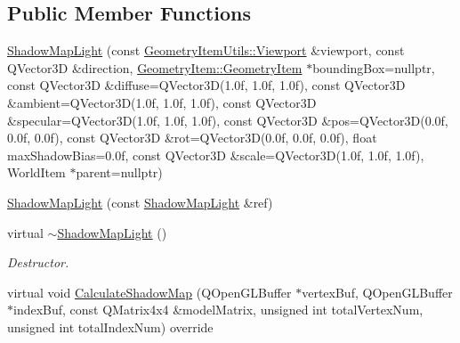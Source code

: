 \subsection*{Public Member Functions}
\begin{DoxyCompactItemize}
\item 
\mbox{\hyperlink{class_geometry_engine_1_1_geometry_world_item_1_1_geometry_light_1_1_shadow_map_light_a3289b4d430e9c738be137a38084d1906}{Shadow\+Map\+Light}} (const \mbox{\hyperlink{class_geometry_engine_1_1_geometry_item_utils_1_1_viewport}{Geometry\+Item\+Utils\+::\+Viewport}} \&viewport, const Q\+Vector3D \&direction, \mbox{\hyperlink{class_geometry_engine_1_1_geometry_world_item_1_1_geometry_item_1_1_geometry_item}{Geometry\+Item\+::\+Geometry\+Item}} $\ast$bounding\+Box=nullptr, const Q\+Vector3D \&diffuse=Q\+Vector3D(1.\+0f, 1.\+0f, 1.\+0f), const Q\+Vector3\+D \&ambient=\+Q\+Vector3\+D(1.\+0f, 1.\+0f, 1.\+0f), const Q\+Vector3\+D \&specular=\+Q\+Vector3\+D(1.\+0f, 1.\+0f, 1.\+0f), const Q\+Vector3\+D \&pos=\+Q\+Vector3\+D(0.\+0f, 0.\+0f, 0.\+0f), const Q\+Vector3\+D \&rot=\+Q\+Vector3\+D(0.\+0f, 0.\+0f, 0.\+0f), float max\+Shadow\+Bias=0.\+0f, const Q\+Vector3\+D \&scale=\+Q\+Vector3\+D(1.\+0f, 1.\+0f, 1.\+0f), World\+Item $\ast$parent=nullptr)
\item 
\mbox{\hyperlink{class_geometry_engine_1_1_geometry_world_item_1_1_geometry_light_1_1_shadow_map_light_a2879b30ef1f4ff318fd55f600001f70f}{Shadow\+Map\+Light}} (const \mbox{\hyperlink{class_geometry_engine_1_1_geometry_world_item_1_1_geometry_light_1_1_shadow_map_light}{Shadow\+Map\+Light}} \&ref)
\item 
\mbox{\label{class_geometry_engine_1_1_geometry_world_item_1_1_geometry_light_1_1_shadow_map_light_a1156dcba4ae7c3f9dce061ef9c0b2e7a}} 
virtual \mbox{\hyperlink{class_geometry_engine_1_1_geometry_world_item_1_1_geometry_light_1_1_shadow_map_light_a1156dcba4ae7c3f9dce061ef9c0b2e7a}{$\sim$\+Shadow\+Map\+Light}} ()
\begin{DoxyCompactList}\small\item\em Destructor. \end{DoxyCompactList}\item 
virtual void \mbox{\hyperlink{class_geometry_engine_1_1_geometry_world_item_1_1_geometry_light_1_1_shadow_map_light_a518efafd59e2dcd446140ae82140e172}{Calculate\+Shadow\+Map}} (Q\+Open\+G\+L\+Buffer $\ast$vertex\+Buf, Q\+Open\+G\+L\+Buffer $\ast$index\+Buf, const Q\+Matrix4x4 \&model\+Matrix, unsigned int total\+Vertex\+Num, unsigned int total\+Index\+Num) override

\end{DoxyCompactItemize}
